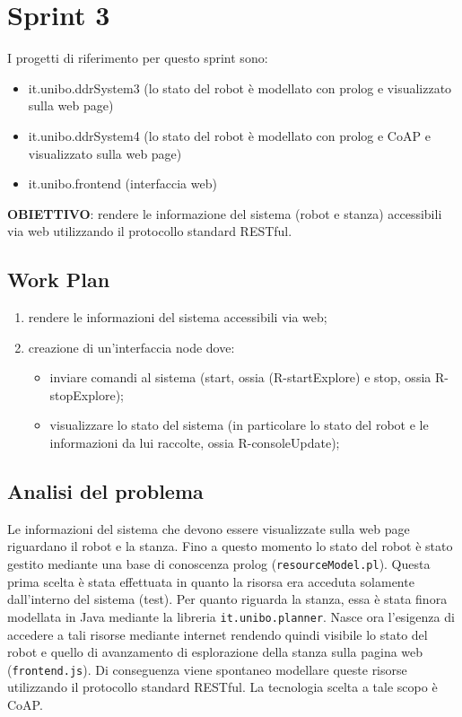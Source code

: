 \section{Sprint 3} 

I progetti di riferimento per questo sprint sono:
\begin{itemize}
    \item it.unibo.ddrSystem3 (lo stato del robot è modellato con prolog e visualizzato sulla web page)
    \item it.unibo.ddrSystem4 (lo stato del robot è modellato con prolog e CoAP e visualizzato sulla web page)
    \item it.unibo.frontend (interfaccia web)
\end{itemize}


\textbf{OBIETTIVO}: rendere le informazione del sistema (robot e stanza) accessibili via web utilizzando il protocollo standard RESTful.

\subsection{Work Plan}
\begin{enumerate}
\item rendere le informazioni del sistema accessibili via web;
\item creazione di un'interfaccia node dove:
    \begin{itemize}
        \item inviare comandi al sistema (start, ossia (R-startExplore) e stop, ossia R-stopExplore); 
        \item visualizzare lo stato del sistema (in particolare lo stato del robot e le informazioni da lui raccolte, ossia R-consoleUpdate);
    \end{itemize}
\end{enumerate}

\subsection{Analisi del problema} 
Le informazioni del sistema che devono essere visualizzate sulla web page riguardano il robot e la stanza.
Fino a questo momento lo stato del robot è stato gestito mediante una base di conoscenza prolog (\texttt{resourceModel.pl}). Questa prima scelta è stata effettuata in quanto la risorsa era acceduta solamente dall'interno del sistema (test).
Per quanto riguarda la stanza, essa è stata finora modellata in Java mediante la libreria \texttt{it.unibo.planner}.
Nasce ora l'esigenza di accedere a tali risorse mediante internet rendendo quindi visibile lo stato del robot e quello di avanzamento di esplorazione della stanza sulla pagina web (\texttt{frontend.js}). Di conseguenza viene spontaneo modellare queste risorse utilizzando il protocollo standard RESTful. La tecnologia scelta a tale scopo è CoAP.

